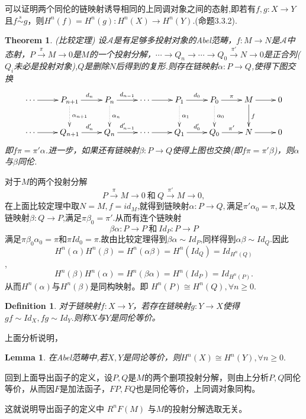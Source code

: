 \documentclass[UTF8]{article}
\newtheorem{thm}{Theorem}[section]
\newtheorem{defn}{Definition}[section]
\newtheorem{lem}{Lemma}[section]
\begin{document}
可以证明两个同伦的链映射诱导相同的上同调对象之间的态射,即若有$f,g:X\rightarrow Y$ 且$f\stackrel{s}{\sim}g$，则$H^{n}(f)=H^{n}(g):H^{n}(X)\rightarrow H^{n}(Y).$(\cite{zh}命题3.3.2).
\begin{thm}
	(比较定理) 设$\mathcal{A}$是有足够多投射对象的Abel范畴，$f:M\rightarrow N$是$\mathcal{A}$中态射，$P\stackrel{\pi}{\rightarrow}M\rightarrow0$是$M$的一个投射分解，$\cdots\rightarrow Q_{n}\rightarrow \cdots\rightarrow Q_{0}\stackrel{\pi'}{\rightarrow}N\rightarrow 0$是正合列($Q_{i}$未必是投射对象),$Q$是删除$N$后得到的复形.则存在链映射$\alpha:P\rightarrow Q$,使得下图交换
	$$
	\xymatrix{
	\cdots\ar[r]&P_{n+1}\ar[r]^{d_{n}}\ar@{.>}[d]^{\alpha_{n+1}}&P_{n}\ar[r]^{d_{n-1}}\ar@{.>}[d]^{\alpha_{n}}&\cdots\ar[r]&P_{1}\ar[r]^{d_{0}}\ar@{.>}[d]^{\alpha_{1}}&P_{0}\ar[r]^{\pi}\ar@{.>}[d]^{\alpha_{0}}&M\ar[r]\ar[d]^{f}&0\\
	\cdots\ar[r]&Q_{n+1}\ar[r]^{d_{n}'}&Q_{n}\ar[r]^{d_{n-1}'}&\cdots\ar[r]&Q_{1}\ar[r]^{d_{0}'}&Q_{0}\ar[r]^{\pi'}&N\ar[r]&0
}
	$$
	即$f\pi=\pi'\alpha$.进一步，如果还有链映射$\beta:P\rightarrow Q$使得上图也交换(即$f\pi=\pi'\beta$)，则$\alpha$与$\beta$同伦.
\end{thm}
对于$M$的两个投射分解
$$
P\stackrel{\pi}{\rightarrow}M\rightarrow0 \ \text{和}\ Q\stackrel{\pi'}{\rightarrow}M\rightarrow0,
$$
在上面比较定理中取$N=M,f=id_{M}$,就得到链映射$\alpha:P\rightarrow Q,$满足$\pi'\alpha_{0}=\pi,$以及链映射$\beta:Q\rightarrow P$,满足$\pi\beta_{0}=\pi'$.从而有连个链映射
$$
\beta\alpha:P\rightarrow P\ \text{和}\ Id_{P}:P\rightarrow P
$$
满足$\pi\beta_{0}\alpha_{0}=\pi$和$\pi Id_{0}=\pi$.故由比较定理得到$\beta\alpha\sim Id_{P}$,同样得到$\alpha\beta\sim Id_{Q}.$因此$$H^{n}(\alpha)H^{n}(\beta)=H^{n}(\alpha\beta)=H^{n}(Id_{Q})=Id_{H^{n}(Q)}$$,
$$H^{n}(\beta)H^{n}(\alpha)=H^{n}(\beta\alpha)=H^{n}(Id_{P})=Id_{H^{n}(P)}.$$从而$H^{n}(\alpha)$与$H^{n}(\beta)$是同构映射。即
$H^{n}(P)\cong H^{n}(Q),\forall n\geq 0.$
\begin{defn}
	对于链映射$f:X\rightarrow Y$，若存在链映射$g:Y\rightarrow X$使得$gf\sim Id_{X},fg\sim Id_{Y}.$则称$X$与$ Y$是同伦等价。
\end{defn}
上面分析说明，
\begin{lem}在Abel范畴中,若$X,Y$是同论等价，则$H^{n}(X)\cong H^{n}(Y),\forall
 n\geq 0.$
\end{lem}
回到上面导出函子的定义，设$P,Q$是$M$的两个删项投射分解，则由上分析$P,Q$同伦等价，从而因$F$是加法函子，$FP,FQ$也是同伦等价，上同调对象同构。

这就说明导出函子的定义中
$R^{n}F(M)$
与$M$的投射分解选取无关。
\end{document}
